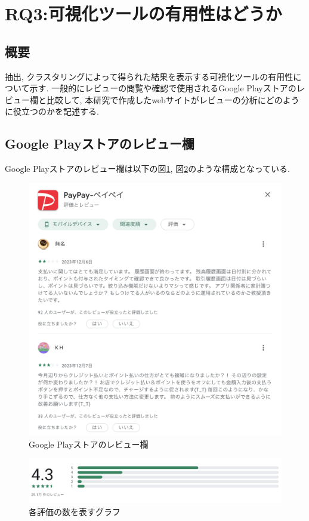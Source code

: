 
\section{RQ3:可視化ツールの有用性はどうか}
\subsection{概要}
抽出, クラスタリングによって得られた結果を表示する可視化ツールの有用性について示す. 一般的にレビューの閲覧や確認で使用されるGoogle Playストアのレビュー欄と比較して, 本研究で作成したwebサイトがレビューの分析にどのように役立つのかを記述する. 

\subsection{Google Playストアのレビュー欄}
Google Playストアのレビュー欄は以下の図\ref{fig:google_play}, 図\ref{fig:google_play_graph}のような構成となっている. 
\begin{figure}[hbtp]
  \centering
  \includegraphics[scale=0.3]
    {contents/images/google_play.png}
  \caption{Google Playストアのレビュー欄\label{fig:google_play}}
\end{figure}

\begin{figure}[hbtp]
  \centering
  \includegraphics[scale=0.3]
    {contents/images/google_play_graph.png}
  \caption{各評価の数を表すグラフ\label{fig:google_play_graph}}
\end{figure}

